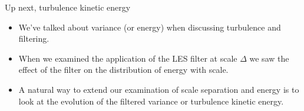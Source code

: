
\begin{frame}{Up next, turbulence kinetic energy}

\begin{itemize}
\item We've talked about variance (or energy) when discussing turbulence and filtering.
\item When we examined the application of the LES filter at scale $\Delta$ we saw the effect of the filter on the distribution of energy with scale.
\item A natural way to extend our examination of scale separation and energy is to look at the evolution of the filtered variance or turbulence kinetic energy.
\end{itemize}

\end{frame}




